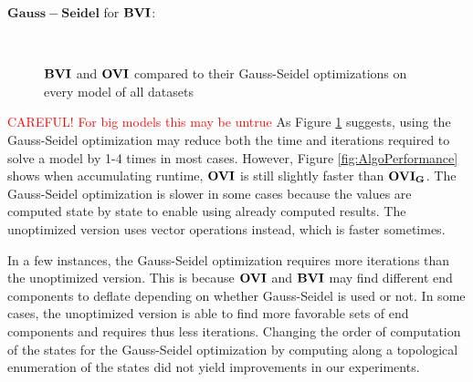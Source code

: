 $\mathbf{Gauss-Seidel}$ for $\mathbf{BVI}$:
\begin{figure}[h!]
    \centering
    \
    \caption{$\mathbf{BVI}$ and $\mathbf{OVI}$ compared to their Gauss-Seidel optimizations on every model of all datasets}%
    \label{fig:Scatter_G}%
    \end{figure}
\FloatBarrier

\textcolor{red}{CAREFUL! For big models this may be untrue}
As Figure \ref{fig:Scatter_G} suggests, using the Gauss-Seidel optimization may reduce both the time and iterations required to solve a model by 1-4 times in most cases.
However, Figure \ref{fig:AlgoPerformance} shows when accumulating runtime, $\mathbf{OVI}$ is still slightly faster than $\mathbf{OVI_G}$.
The Gauss-Seidel optimization is slower in some cases because the values are computed state by state to enable using already computed results.
The unoptimized version uses vector operations instead, which is faster sometimes.

In a few instances, the Gauss-Seidel optimization requires more iterations than the unoptimized version. 
This is because $\mathbf{OVI}$ and $\mathbf{BVI}$ may find different end components to deflate depending on whether Gauss-Seidel is used or not.
In some cases, the unoptimized version is able to find more favorable sets of end components and requires thus less iterations.
Changing the order of computation of the states for the Gauss-Seidel optimization by computing along a topological enumeration of the states did not
yield improvements in our experiments.  

